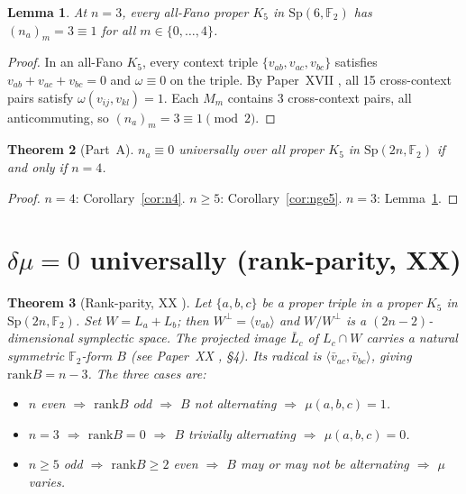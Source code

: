 \documentclass[11pt,a4paper]{article}
\newcommand{\Sp}{\mathrm{Sp}}
\newcommand{\rank}{\mathrm{rank}}
\newcommand{\F}{\mathbb{F}}
\theoremstyle{plain}
\newtheorem{theorem}{Theorem}[section]
\newtheorem{lemma}[theorem]{Lemma}
\theoremstyle{definition}
\theoremstyle{remark}
\begin{document}
\begin{lemma}\label{lem:n3}
At $n = 3$, every all-Fano proper $K_5$ in $\Sp(6,\F_2)$ has
$(n_a)_m = 3 \equiv 1$ for all $m \in \{0,\ldots,4\}$.
\end{lemma}

\begin{proof}
In an all-Fano $K_5$, every context triple $\{v_{ab},v_{ac},v_{bc}\}$
satisfies $v_{ab}+v_{ac}+v_{bc}=0$ and $\omega \equiv 0$ on the triple.
By Paper~XVII \cite{PaperXVII}, all 15 cross-context pairs satisfy
$\omega(v_{ij},v_{kl}) = 1$.
Each $M_m$ contains 3 cross-context pairs, all anticommuting,
so $(n_a)_m = 3 \equiv 1 \pmod{2}$.
\end{proof}

\begin{theorem}[Part~A]\label{thm:partA}
$n_a \equiv 0$ universally over all proper $K_5$ in $\Sp(2n,\F_2)$
if and only if $n = 4$.
\end{theorem}

\begin{proof}
$n = 4$: Corollary~\ref{cor:n4}.
$n \geq 5$: Corollary~\ref{cor:nge5}.
$n = 3$: Lemma~\ref{lem:n3}.
\end{proof}

\section{\texorpdfstring{\boldmath$\delta\mu = 0$ universally (rank-parity, XX)}{Part B: delta-mu = 0 universally (rank-parity, XX)}}
\label{sec:partB}

\begin{theorem}[Rank-parity, XX \cite{PaperXX}]\label{thm:rankparity}
Let $\{a,b,c\}$ be a proper triple in a proper $K_5$ in $\Sp(2n,\F_2)$.
Set $W = L_a + L_b$; then $W^\perp = \langle v_{ab}\rangle$ and
$W/W^\perp$ is a $(2n{-}2)$-dimensional symplectic space.
The projected image $\bar{L}_c$ of $L_c \cap W$ carries a natural
symmetric $\F_2$-form $B$ (see Paper~XX \cite{PaperXX}, \S4).
Its radical is $\langle \bar{v}_{ac}, \bar{v}_{bc}\rangle$,
giving $\rank B = n - 3$.
The three cases are:
\begin{itemize}
  \item $n$ even $\Rightarrow$ $\rank B$ odd $\Rightarrow$
        $B$ not alternating $\Rightarrow$ $\mu(a,b,c) = 1$.
  \item $n = 3$ $\Rightarrow$ $\rank B = 0$ $\Rightarrow$
        $B$ trivially alternating $\Rightarrow$ $\mu(a,b,c) = 0$.
  \item $n \geq 5$ odd $\Rightarrow$ $\rank B \geq 2$ even
        $\Rightarrow$ $B$ may or may not be alternating
        $\Rightarrow$ $\mu$ varies.
\end{itemize}
\end{theorem}
\end{document}
